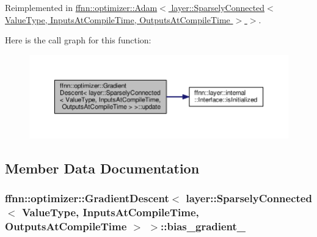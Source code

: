 Reimplemented in \hyperlink{classffnn_1_1optimizer_1_1_adam_3_01layer_1_1_sparsely_connected_3_01_value_type_00_01_inputs_at5101e46d32858ec2169acdeede08d723_aaa3b2eb55a9d80d51330c132df65214b}{ffnn\-::optimizer\-::\-Adam$<$ layer\-::\-Sparsely\-Connected$<$ Value\-Type, Inputs\-At\-Compile\-Time, Outputs\-At\-Compile\-Time $>$ $>$}.



Here is the call graph for this function\-:\nopagebreak
\begin{figure}[H]
\begin{center}
\leavevmode
\includegraphics[width=350pt]{classffnn_1_1optimizer_1_1_gradient_descent_3_01layer_1_1_sparsely_connected_3_01_value_type_00_e6c27913ab0d90f52f73031aa88c19bf_ada280929e93a2d12f0bc21e9077e75a1_cgraph}
\end{center}
\end{figure}




\subsection{Member Data Documentation}
\hypertarget{classffnn_1_1optimizer_1_1_gradient_descent_3_01layer_1_1_sparsely_connected_3_01_value_type_00_e6c27913ab0d90f52f73031aa88c19bf_a38013045946f2a6d8a30445c9048654f}{
\subsubsection[{bias\-\_\-gradient\-\_\-}]{ {\bf ffnn\-::optimizer\-::\-Gradient\-Descent}$<$ {\bf layer\-::\-Sparsely\-Connected}$<$ Value\-Type, Inputs\-At\-Compile\-Time, Outputs\-At\-Compile\-Time $>$ $>$\-::bias\-\_\-gradient\-\_\-\hspace{0.3cm}{\ttfamily [protected]}}}\label{classffnn_1_1optimizer_1_1_gradient_descent_3_01layer_1_1_sparsely_connected_3_01_value_type_00_e6c27913ab0d90f52f73031aa88c19bf_a38013045946f2a6d8a30445c9048654f}



